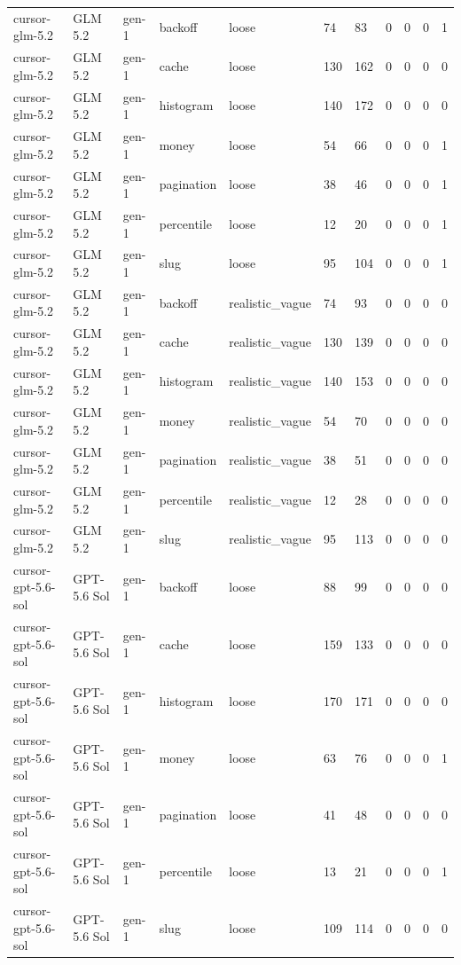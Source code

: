 \begin{tabular}{lllllllllll}
cursor-glm-5.2 & GLM 5.2 & gen-1 & backoff & loose & 74 & 83 & 0 & 0 & 0 & 1 \\
cursor-glm-5.2 & GLM 5.2 & gen-1 & cache & loose & 130 & 162 & 0 & 0 & 0 & 0 \\
cursor-glm-5.2 & GLM 5.2 & gen-1 & histogram & loose & 140 & 172 & 0 & 0 & 0 & 0 \\
cursor-glm-5.2 & GLM 5.2 & gen-1 & money & loose & 54 & 66 & 0 & 0 & 0 & 1 \\
cursor-glm-5.2 & GLM 5.2 & gen-1 & pagination & loose & 38 & 46 & 0 & 0 & 0 & 1 \\
cursor-glm-5.2 & GLM 5.2 & gen-1 & percentile & loose & 12 & 20 & 0 & 0 & 0 & 1 \\
cursor-glm-5.2 & GLM 5.2 & gen-1 & slug & loose & 95 & 104 & 0 & 0 & 0 & 1 \\
cursor-glm-5.2 & GLM 5.2 & gen-1 & backoff & realistic\_vague & 74 & 93 & 0 & 0 & 0 & 0 \\
cursor-glm-5.2 & GLM 5.2 & gen-1 & cache & realistic\_vague & 130 & 139 & 0 & 0 & 0 & 0 \\
cursor-glm-5.2 & GLM 5.2 & gen-1 & histogram & realistic\_vague & 140 & 153 & 0 & 0 & 0 & 0 \\
cursor-glm-5.2 & GLM 5.2 & gen-1 & money & realistic\_vague & 54 & 70 & 0 & 0 & 0 & 0 \\
cursor-glm-5.2 & GLM 5.2 & gen-1 & pagination & realistic\_vague & 38 & 51 & 0 & 0 & 0 & 0 \\
cursor-glm-5.2 & GLM 5.2 & gen-1 & percentile & realistic\_vague & 12 & 28 & 0 & 0 & 0 & 0 \\
cursor-glm-5.2 & GLM 5.2 & gen-1 & slug & realistic\_vague & 95 & 113 & 0 & 0 & 0 & 0 \\
cursor-gpt-5.6-sol & GPT-5.6 Sol & gen-1 & backoff & loose & 88 & 99 & 0 & 0 & 0 & 0 \\
cursor-gpt-5.6-sol & GPT-5.6 Sol & gen-1 & cache & loose & 159 & 133 & 0 & 0 & 0 & 0 \\
cursor-gpt-5.6-sol & GPT-5.6 Sol & gen-1 & histogram & loose & 170 & 171 & 0 & 0 & 0 & 0 \\
cursor-gpt-5.6-sol & GPT-5.6 Sol & gen-1 & money & loose & 63 & 76 & 0 & 0 & 0 & 1 \\
cursor-gpt-5.6-sol & GPT-5.6 Sol & gen-1 & pagination & loose & 41 & 48 & 0 & 0 & 0 & 0 \\
cursor-gpt-5.6-sol & GPT-5.6 Sol & gen-1 & percentile & loose & 13 & 21 & 0 & 0 & 0 & 1 \\
cursor-gpt-5.6-sol & GPT-5.6 Sol & gen-1 & slug & loose & 109 & 114 & 0 & 0 & 0 & 0 \\

\end{tabular}
